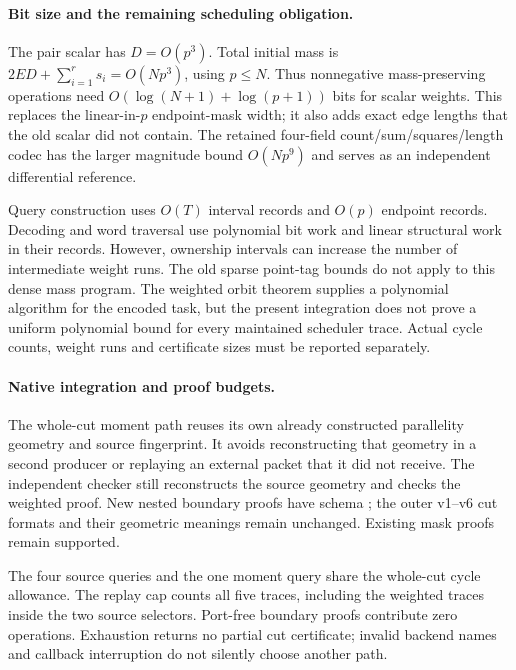 \paragraph{Bit size and the remaining scheduling obligation.}
The pair scalar has $D=O(p^3)$. Total initial mass is
$2ED+\sum_{i=1}^r s_i=O(Np^3)$, using $p\le N$. Thus nonnegative
mass-preserving operations need $O(\log(N+1)+\log(p+1))$ bits for scalar
weights. This replaces the linear-in-$p$ endpoint-mask width; it also adds
exact edge lengths that the old scalar did not contain. The retained
four-field count/sum/squares/length codec has the larger magnitude bound
$O(Np^9)$ and serves as an independent differential reference.

Query construction uses $O(T)$ interval records and $O(p)$ endpoint records.
Decoding and word traversal use polynomial bit work and linear structural
work in their records. However, ownership intervals can increase the number
of intermediate weight runs. The old sparse point-tag bounds do not apply
to this dense mass program. The weighted orbit theorem
\cite[Theorem 16]{aht-orbits} supplies a polynomial
algorithm for the encoded task, but the present integration does not prove
a uniform polynomial bound for every maintained scheduler trace. Actual
cycle counts, weight runs and certificate sizes must be reported separately.

\paragraph{Native integration and proof budgets.}
The whole-cut moment path reuses its own already constructed parallelity
geometry and source fingerprint. It avoids reconstructing that geometry
in a second producer or replaying an external packet that it did not receive.
The independent checker still reconstructs the source geometry and checks
the weighted proof. New nested boundary proofs have schema
; the outer v1--v6 cut formats and their
geometric meanings remain unchanged. Existing mask proofs remain supported.

The four source queries and the one moment query share the whole-cut cycle
allowance. The replay cap counts all five traces, including the weighted
traces inside the two source selectors. Port-free boundary proofs contribute
zero operations. Exhaustion returns no partial cut certificate; invalid
backend names and callback interruption do not silently choose another path.


